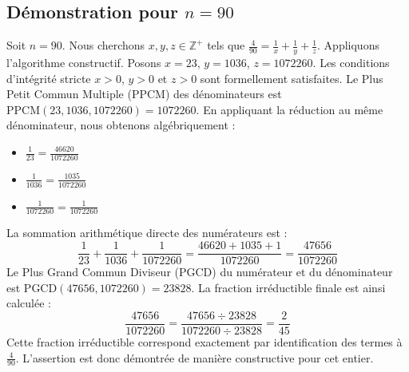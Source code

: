 \documentclass[11pt,a4paper]{article}
\begin{document}
\subsection{Démonstration pour $n = 90$}
Soit $n = 90$. Nous cherchons $x, y, z \in \mathbb{Z}^{+}$ tels que $\frac{4}{90} = \frac{1}{x} + \frac{1}{y} + \frac{1}{z}$.
Appliquons l'algorithme constructif. Posons $x = 23$, $y = 1036$, $z = 1072260$.
Les conditions d'intégrité stricte $x > 0$, $y > 0$ et $z > 0$ sont formellement satisfaites.
Le Plus Petit Commun Multiple (PPCM) des dénominateurs est $\text{PPCM}(23, 1036, 1072260) = 1072260$.
En appliquant la réduction au même dénominateur, nous obtenons algébriquement :
\begin{itemize}
    \item $\frac{1}{23} = \frac{46620}{1072260}$
    \item $\frac{1}{1036} = \frac{1035}{1072260}$
    \item $\frac{1}{1072260} = \frac{1}{1072260}$
\end{itemize}
La sommation arithmétique directe des numérateurs est :
$$ \frac{1}{23} + \frac{1}{1036} + \frac{1}{1072260} = \frac{46620 + 1035 + 1}{1072260} = \frac{47656}{1072260} $$
Le Plus Grand Commun Diviseur (PGCD) du numérateur et du dénominateur est $\text{PGCD}(47656, 1072260) = 23828$.
La fraction irréductible finale est ainsi calculée :
$$ \frac{47656}{1072260} = \frac{47656 \div 23828}{1072260 \div 23828} = \frac{2}{45} $$
Cette fraction irréductible correspond exactement par identification des termes à $\frac{4}{90}$. L'assertion est donc démontrée de manière constructive pour cet entier.
\end{document}
